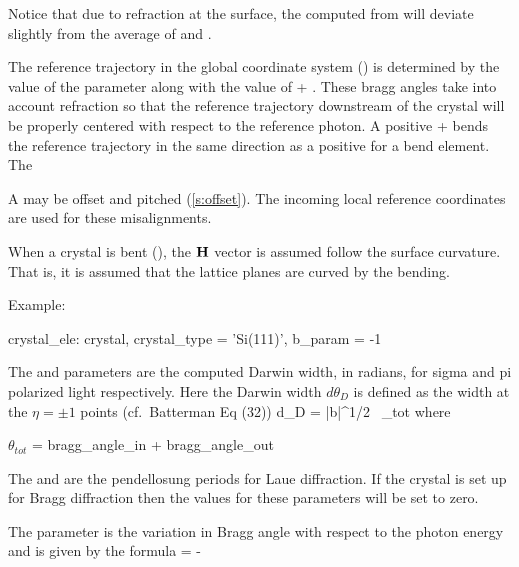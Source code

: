 Notice that due to refraction at the surface, the computed
 from  will deviate slightly from the
average of  and .

The reference trajectory in the global coordinate system
() is determined by the value of the 
parameter along with the value of  +
. These bragg angles take into account refraction
so that the reference trajectory downstream of the crystal will be
properly centered with respect to the reference photon. A positive
 +  bends the reference
trajectory in the same direction as a positive  for a bend
element. The

A  may be offset and pitched (\ref{s:offset}). The incoming
local reference coordinates are used for these misalignments. 

When a crystal is bent (), the ${\bf H}$ vector is
assumed follow the surface curvature. That is, it is assumed that the
lattice planes are curved by the bending.

Example:
\begin{example}
  crystal_ele: crystal, crystal_type = 'Si(111)', b_param = -1
\end{example}

The  and  parameters are
the computed Darwin width, in radians, for sigma and pi polarized
light respectively. Here the Darwin width $d\theta_D$ is defined as
the width at the $\eta = \pm 1$ points
(cf.~Batterman\cite{b:batterman} Eq (32))
\Begineq
  d\theta_D = 
                 {|b|^{1/2} \, \sin\theta_{tot}}
\Endeq
where
\begin{example}
  \(\theta_{tot}\) = bragg_angle_in + bragg_angle_out 
\end{example}

The  and  are
the pendellosung periods for Laue diffraction. If the crystal is set up for
Bragg diffraction then the values for these parameters will be set to zero.

The  parameter is the variation in Bragg angle
with respect to the photon energy and is given by the formula
\Begineq
   = -
\Endeq

